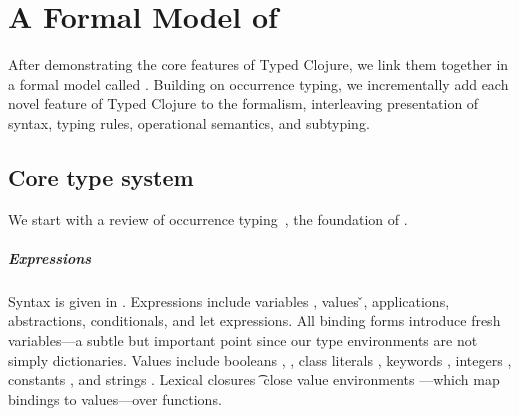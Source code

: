 \chapter{A Formal Model of \lambdatc{}}

\label{sec:formal}

After demonstrating the core features of Typed Clojure, 
we link them together in a formal model called
\lambdatc{}.
%
Building on occurrence typing,
we incrementally add each
novel feature of Typed Clojure to the formalism,
interleaving presentation of syntax, typing rules, operational semantics,
and subtyping.

\section{Core type system}
\label{sec:coretypesystem}

We start with a review of
occurrence typing~\cite{TF10}, the foundation of \lambdatc{}.

\paragraph{Expressions} Syntax is given in . Expressions \e{} 
include variables \x{}, values \v{},
applications, abstractions, conditionals, and let expressions.
All binding forms introduce fresh variables---a subtle but important point since our type environments
are not simply dictionaries.
Values include booleans \bool{}, \nil{}, class literals {\class{}}, keywords \kw{},
integers {\nat{}},
constants {\const{}}, and strings \str{}. Lexical closures {\closure {\openv{}} {\abs {\x{}} {\t{}} {\e{}}}}
close value environments \openv{}---which map bindings to values---over functions.

